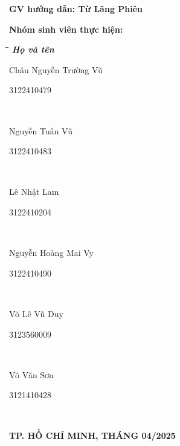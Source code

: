 \documentclass[a4paper]{article}
\begin{document}
\begin{titlepage}
    \vspace{15pt}
    \textbf{GV hướng dẫn: Từ Lãng Phiêu}

    \vspace{10pt}
    \textbf{Nhóm sinh viên thực hiện:}

    \begin{tabbing}
        \hspace{8cm}\=\hspace{3cm}\=\hspace{3cm} \kill
        {\it \textbf{Họ và tên}}\\
        \begin{bfseries}Châu Nguyễn Trường Vũ\end{bfseries}\> \begin{bfseries}3122410479\end{bfseries}\\
        \begin{bfseries}Nguyễn Tuấn Vũ\end{bfseries}\> \begin{bfseries}3122410483\end{bfseries}\\
        \begin{bfseries}Lê Nhật Lam\end{bfseries}\> \begin{bfseries}3122410204\end{bfseries}\\
        \begin{bfseries}Nguyễn Hoàng Mai Vy\end{bfseries}\> \begin{bfseries}3122410490\end{bfseries}\\
        \begin{bfseries}Võ Lê Vũ Duy\end{bfseries}\> \begin{bfseries}3123560009\end{bfseries}\\
        \begin{bfseries}Võ Văn Sơn\end{bfseries}\> \begin{bfseries}3121410428\end{bfseries}\\

    \end{tabbing}
    \vspace{10pt}
    \begin{center}
        \textbf{TP. HỒ CHÍ MINH, THÁNG 04/2025}
    \end{center}
\end{titlepage}
\newpage
\thispagestyle{empty} %
\mbox{} %
\newpage
\newpage
\end{document}

